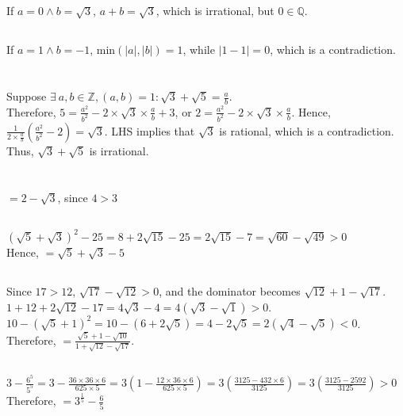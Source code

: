 \documentclass[12pt]{article}
\theoremstyle{definition}
\theoremstyle{remark}
\begin{document}
\subsection{}
If $a=0 \wedge  b=\sqrt{3}$, $a+b=\sqrt{3}$, which is irrational, but
$0 \in \mathbb{Q}$.
\subsection{}
If $a=1 \wedge b=-1$, min$(|a|,|b|)=1$, while $|1-1|=0$, which is a
contradiction.
\section{}
Suppose $\exists\ a,b \in \mathbb{Z}, (a,b)=1: \sqrt{3}+\sqrt{5}=\frac{a}{b}$.\\
Therefore, $5=\frac{a^2}{b^2}-2\times\sqrt{3}\times\frac{a}{b}+3$, or
$2=\frac{a^2}{b^2}-2\times\sqrt{3}\times\frac{a}{b}$. Hence,
$\frac{1}{2\times\frac{a}{b}}(\frac{a^2}{b^2}-2)=\sqrt{3}$. LHS
implies that $\sqrt{3}$ is rational, which is a contradiction. Thus,
$\sqrt{3}+\sqrt{5}$ is irrational.
\section{}
\subsection{}
$=2-\sqrt{3}$, since $4>3$
\subsection{}
$(\sqrt{5}+\sqrt{3})^2-25=8+2\sqrt{15}-25=2\sqrt{15}-7=\sqrt{60}-\sqrt{49}>0$\\
Hence, $=\sqrt{5}+\sqrt{3}-5$
\subsection{}
Since $17>12$, $\sqrt{17}-\sqrt{12}>0$, and the dominator becomes
$\sqrt{12}+1-\sqrt{17}$.\\
$1+12+2\sqrt{12}-17=4\sqrt{3}-4=4(\sqrt{3}-\sqrt{1})>0$.\\
$10-(\sqrt{5}+1)^2=10-(6+2\sqrt5)=4-2\sqrt{5}=2(\sqrt{4}-\sqrt{5})<0$.\\
Therefore, $=\frac{\sqrt{5}+1-\sqrt{10}}{1+\sqrt{12}-\sqrt{17}}$.
\subsection{}
$3-\frac{6^5}{5^5}=3-\frac{36\times36\times6}{625\times5}=
3(1-\frac{12\times36\times6}{625\times5})=3(\frac{3125-432\times6}{3125})=
3(\frac{3125-2592}{3125})>0$\\
Therefore, $=3^{\frac{1}{5}}-\frac{6}{5}$
\end{document}
